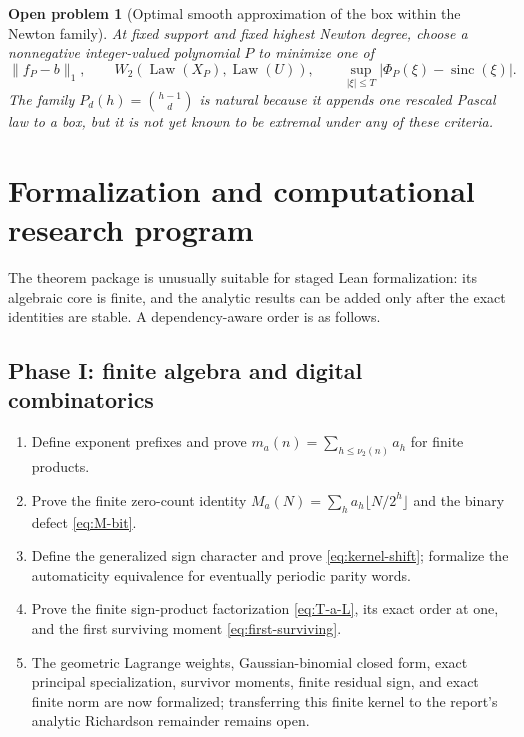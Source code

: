 \documentclass[11pt,oneside]{article}
\numberwithin{equation}{section}
\newtheorem{problem}[theorem]{Open problem}
\theoremstyle{definition}
\theoremstyle{remark}
\newcommand{\Law}{\operatorname{Law}}
\newcommand{\sinc}{\operatorname{sinc}}
\begin{document}
\begin{problem}[Optimal smooth approximation of the box within the Newton family]
At fixed support and fixed highest Newton degree, choose a nonnegative integer-valued
polynomial $P$ to minimize one of
\[
 \|f_P-b\|_1,
 \qquad
 W_2(\Law(X_P),\Law(U)),
 \qquad
 \sup_{|\xi|\le T}|\Phi_P(\xi)-\sinc(\xi)|.
\]
The family $P_d(h)=\binom{h-1}{d}$ is natural because it appends one rescaled Pascal law to a
box, but it is not yet known to be extremal under any of these criteria.
\end{problem}


\section{Formalization and computational research program}
\label{sec:formalization}

The theorem package is unusually suitable for staged Lean formalization: its algebraic core
is finite, and the analytic results can be added only after the exact identities are stable.
A dependency-aware order is as follows.

\subsection{Phase I: finite algebra and digital combinatorics}

\begin{enumerate}
\item Define exponent prefixes and prove
      $m_a(n)=\sum_{h\le\nu_2(n)}a_h$ for finite products.
\item Prove the finite zero-count identity
      $M_a(N)=\sum_ha_h\lfloor N/2^h\rfloor$ and the binary defect
      \eqref{eq:M-bit}.
\item Define the generalized sign character and prove
      \eqref{eq:kernel-shift}; formalize the automaticity equivalence for eventually
      periodic parity words.
\item Prove the finite sign-product factorization \eqref{eq:T-a-L}, its exact order at one,
      and the first surviving moment \eqref{eq:first-surviving}.
\item The geometric Lagrange weights, Gaussian-binomial closed form, exact
      principal specialization, survivor moments, finite residual sign, and exact finite
      norm are now formalized; transferring this finite kernel to the report's analytic
      Richardson remainder remains open.
\end{enumerate}
\end{document}
